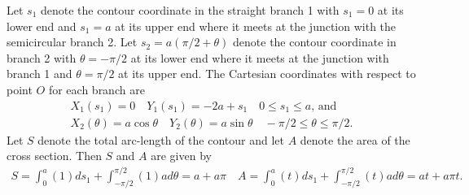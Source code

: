 \documentclass{AeroStructure-ERJohnson}
\begin{document}
\vspace*{-1.4pc}

\begin{example*}\setcounter{equation}{0}\label{ex3.1}Let $s_{1}$ denote the contour coordinate in the straight branch 1 with $s_{1}=0$ at its lower end and $s_{1}=a$ at its upper end where it meets at the junction with the semicircular branch 2. Let $s_{2}=a(\pi / 2+\theta)$ denote the contour coordinate in branch 2 with $\theta=-\pi / 2$ at its lower end where it meets at the junction with branch 1 and $\theta=\pi / 2$ at its upper end. The Cartesian coordinates with respect to point $O$ for each branch are
\begin{gather}
X_{1}\left(s_{1}\right)=0 \quad Y_{1}\left(s_{1}\right)=-2 a+s_{1} \quad 0 \leq s_{1} \leq a\mbox{, and}\label{ex3.1a}\\
X_{2}(\theta)=a \cos \theta \quad Y_{2}(\theta)=a \sin \theta \quad-\pi / 2 \leq \theta \leq \pi / 2.\label{ex3.1b}
\end{gather}
Let $S$ denote the total arc-length of the contour and let $A$ denote the area of the cross section. Then $S$ and $A$ are given by
\begin{align}\label{ex3.1c}
S=\int_{0}^{a}(1) d s_{1}+\int_{-\pi / 2}^{\pi / 2}(1) a d \theta=a+a \pi \quad A=\int_{0}^{a}(t) d s_{1}+\int_{-\pi / 2}^{\pi / 2}(t) a d \theta=a t+a \pi t.
\end{align}

\removelastskip


\end{example*}
\end{document}
